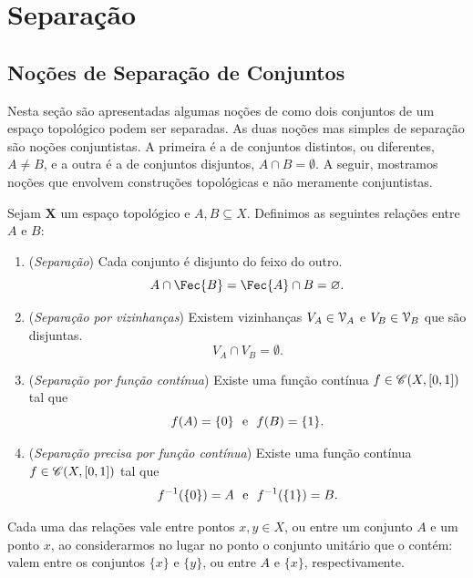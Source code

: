 \section{Separação}

\subsection{Noções de Separação de Conjuntos}

Nesta seção são apresentadas algumas noções de como dois conjuntos de um espaço topológico podem ser separadas. As duas noções mas simples de separação são noções conjuntistas. A primeira é a de conjuntos distintos, ou diferentes, $A \neq B$, e a outra é a de conjuntos disjuntos, $A \cap B = \emptyset$. A seguir, mostramos noções que envolvem construções topológicas e não meramente conjuntistas.

\begin{defi}
Sejam $\bm X$ um espaço topológico e $A,B \subseteq X$. Definimos as seguintes relações entre $A$ e $B$:
	\begin{enumerate}
	\item (\emph{Separação}) Cada conjunto é disjunto do feixo do outro.
	\begin{equation*}
	A \cap \Fec{B} = \Fec{A} \cap B = \emptyset.
	\end{equation*}
	\item (\emph{Separação por vizinhanças}) Existem vizinhanças $V_A \in \mathcal{V}_A$ e $V_B \in \mathcal{V}_B$ que são disjuntas.
	\begin{equation*}
	V_A \cap V_B = \emptyset.
	\end{equation*}
	\item (\emph{Separação por função contínua}) Existe uma função contínua $f \in \mathscr{C}(X,[0,1])$ tal que
	\begin{equation*}
	f(A)=\{0\} \text{\ \ e\ \ } f(B)=\{1\}.
	\end{equation*}
	\item (\emph{Separação precisa por função contínua}) Existe uma função contínua $f \in \mathscr{C}(X,[0,1])$ tal que
	\begin{equation*}
	f^{-1}(\{0\})=A \text{\ \ e\ \ } f^{-1}(\{1\})=B.
	\end{equation*}
	\end{enumerate}
Cada uma das relações vale entre pontos $x,y \in X$, ou entre um conjunto $A$ e um ponto $x$, ao considerarmos no lugar no ponto o conjunto unitário que o contém: valem entre os conjuntos $\{x\}$ e $\{y\}$, ou entre $A$ e $\{x\}$, respectivamente.
\end{defi}

